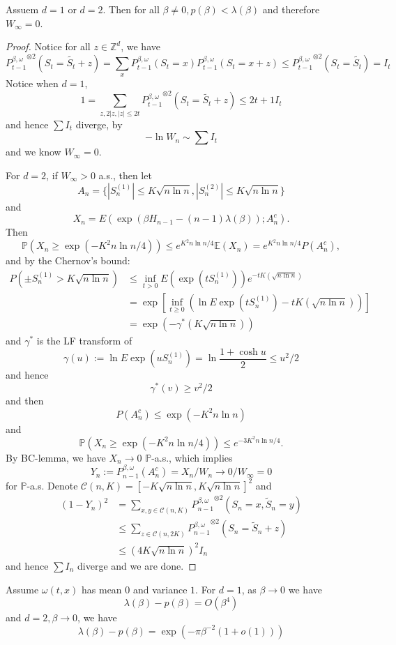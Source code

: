 \begin{theorem}
    Assuem $d = 1$ or $d=2$. Then for all $\beta \neq 0, p(\beta) < \lambda(\beta)$ and therefore $W_{\infty} = 0$.
\end{theorem}
\begin{proof}
    Notice for all $z\in \mathbb{Z}^d$, we have
    \[
    {P_{t-1}^{\beta,\omega}}^{\otimes 2}(S_t = \tilde{S_t}+z) = \sum\limits_{x} P_{t-1}^{\beta,\omega}(S_t= x)P_{t-1}^{\beta,\omega}(S_t= x+z) \leq {P_{t-1}^{\beta,\omega}}^{\otimes 2}(S_t = \tilde{S_t}) = I_t 
    \]
    Notice when $d=1$,
    \[
    1 = \sum_{z, 2|z,|z| \leq 2t} {P_{t-1}^{\beta,\omega}}^{\otimes 2}(S_t = \tilde{S_t}+z) \leq 2t+1 I_t
    \]
    and hence $\sum I_t$ diverge, by
    \[
    -\ln W_n \sim \sum I_t
    \]
    and we know $W_{\infty} = 0$.\par
    For $d=2$, if $W_{\infty} > 0$ a.s., then let
    \[
    A_n = \{|S_n^{(1)}|\leq K\sqrt{n\ln n},|S_n^{(2)}|\leq K\sqrt{n\ln n}\}
    \]
    and
    \[
    X_n = E(\exp(\beta H_{n-1} - (n-1)\lambda(\beta)); A_n^c).
    \]
    Then
    \[
    \mathbb{P}\left(X_n \geq \exp(-K^2n\ln n/4)\right) \leq e^{K^2 n\ln n /4} \mathbb{E}(X_n) = e^{K^2 n\ln n /4}P(A_n^c),
    \]
    and by the Chernov's bound:
    \[
    \begin{aligned}
        P(\pm S_n^{(1)} > K\sqrt{n\ln n}) &\leq \inf_{t>0} E(\exp(tS_n^{(1)}))e^{-tK(\sqrt{n\ln n})} \\
        &=\exp\left[\inf_{t\geq 0} \left(\ln E\exp(tS_n^{(1)}) - tK(\sqrt{n\ln n})\right)\right] \\
        &=\exp\left(- \gamma^*(K\sqrt{n\ln n})\right)
    \end{aligned}
    \]
    and $\gamma^*$ is the LF transform of
    \[
    \gamma(u):=\ln E\exp(uS_n^{(1)}) = \ln\dfrac{1+\cosh u}{2} \leq u^2/2
    \]
    and hence
    \[
    \gamma^*(v) \geq v^2/2
    \]
    and then
    \[
    P(A_n^c) \leq \exp(-K^2 n\ln n)
    \]
    and
    \[
    \mathbb{P}(X_n \geq \exp(-K^2 n \ln n /4)) \leq e^{-3K^2 n\ln n/4}.
    \]
    By BC-lemma, we have $X_n \to 0$ $\mathbb{P}$-a.s., which implies
    \[
    Y_n:= P_{n-1}^{\beta,\omega}(A_n^c) = X_n/W_n \to 0/W_{\infty} = 0
    \]
    for $\mathbb{P}$-a.s. Denote $\mathcal{C}(n,K) = [-K\sqrt{n\ln n}, K\sqrt{n\ln n}]^2$ and
    \[
    \begin{aligned}
        (1-Y_n)^2 &= \sum\limits_{x,y\in \mathcal{C}(n,K)}{P_{n-1}^{\beta,\omega}}^{\otimes 2}(S_n = x, \tilde{S}_n = y) \\
        &\leq \sum\limits_{z\in \mathcal{C}(n,2K)}{P_{n-1}^{\beta,\omega}}^{\otimes 2}(S_n = \tilde{S}_n + z) \\
        &\leq (4K\sqrt{n\ln n})^2I_n
    \end{aligned}
    \]
    and hence $\sum I_n$ diverge and we are done.
\end{proof}

\begin{theorem}
    Assume $\omega(t,x)$ has mean $0$ and variance $1$. For $d = 1$, as $\beta \to 0$ we have
    \[
    \lambda(\beta) - p(\beta) = O(\beta^4)
    \]
    and $d= 2, \beta \to 0$, we have
    \[\lambda(\beta) - p(\beta) = \exp(-\pi\beta^{-2}(1+o(1)))\]
\end{theorem}

